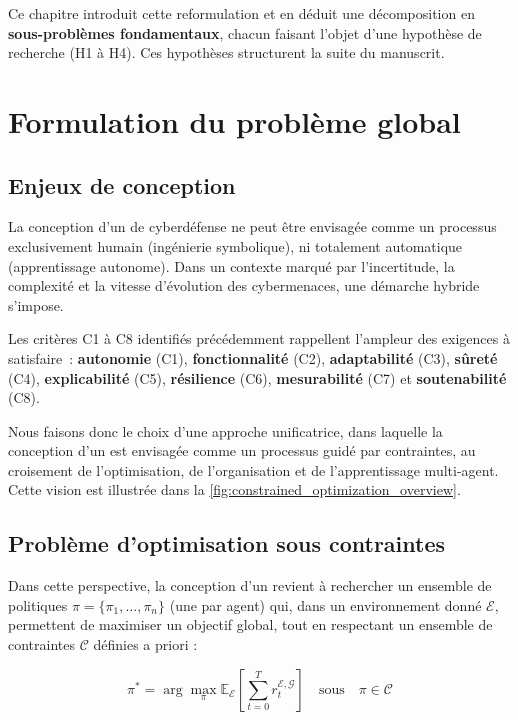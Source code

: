 Ce chapitre introduit cette reformulation et en déduit une décomposition en \textbf{sous-problèmes fondamentaux}, chacun faisant l’objet d’une hypothèse de recherche (H1 à H4). Ces hypothèses structurent la suite du manuscrit.

\section{Formulation du problème global}

\subsection{Enjeux de conception}

La conception d’un  de cyberdéfense ne peut être envisagée comme un processus exclusivement humain (ingénierie symbolique), ni totalement automatique (apprentissage autonome). Dans un contexte marqué par l’incertitude, la complexité et la vitesse d’évolution des cybermenaces, une démarche hybride s’impose.

Les critères C1 à C8 identifiés précédemment rappellent l’ampleur des exigences à satisfaire~: \textbf{autonomie} (C1), \textbf{fonctionnalité} (C2), \textbf{adaptabilité} (C3), \textbf{sûreté} (C4), \textbf{explicabilité} (C5), \textbf{résilience} (C6), \textbf{mesurabilité} (C7) et \textbf{soutenabilité} (C8).

Nous faisons donc le choix d’une approche unificatrice, dans laquelle la conception d’un  est envisagée comme un processus guidé par contraintes, au croisement de l’optimisation, de l’organisation et de l’apprentissage multi-agent. Cette vision est illustrée dans la \autoref{fig:constrained_optimization_overview}.

\subsection{Problème d’optimisation sous contraintes}

Dans cette perspective, la conception d’un  revient à rechercher un ensemble de politiques $\pi = \{\pi_1, \dots, \pi_n\}$ (une par agent) qui, dans un environnement donné $\mathcal{E}$, permettent de maximiser un objectif global, tout en respectant un ensemble de contraintes $\mathcal{C}$ définies a priori :

\begin{equation}
  \pi^* = \arg\max_{\pi} \mathbb{E}_{\mathcal{E}} \left[ \sum_{t=0}^{T} r^{\mathcal{E}, \mathcal{G}}_t \right] \quad \text{sous} \quad \pi \in \mathcal{C}
\end{equation}

